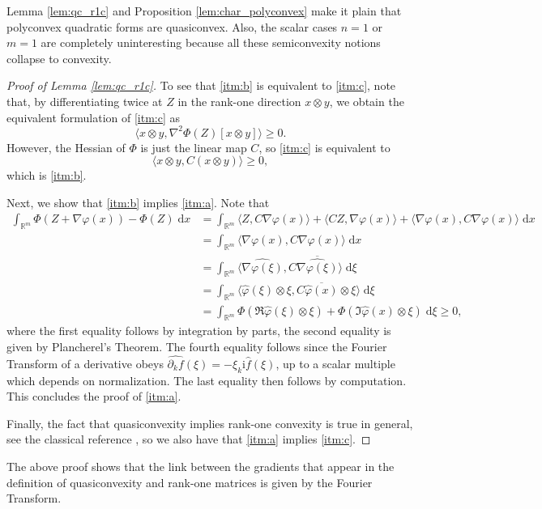 \documentclass[a4paper]{article}
\numberwithin{equation}{section}
\newcommand{\R}{\mathbb{R}}
\newcommand{\dif}{\mathrm{\;d}}
\theoremstyle{definition}
\theoremstyle{remark}
\begin{document}
Lemma \ref{lem:qc_r1c} and Proposition \ref{lem:char_polyconvex} make it plain that polyconvex quadratic forms are quasiconvex. Also, the scalar cases $n=1$ or $m=1$ are completely uninteresting because all these semiconvexity notions collapse to convexity.
\begin{proof}[Proof of Lemma \ref{lem:qc_r1c}]
To see that \ref{itm:b} is equivalent to \ref{itm:c}, note that, by differentiating twice at $Z$ in the rank-one direction $x\otimes y$, we obtain the equivalent formulation of \ref{itm:c} as
$$
\langle x\otimes y, \nabla^2 \Phi(Z) [x\otimes y] \rangle\geq 0.
$$
However, the Hessian of $\Phi$ is just the linear map $C$, so \ref{itm:c} is equivalent to
$$
\langle x\otimes y, C (x\otimes y) \rangle\geq 0,
$$
which is \ref{itm:b}. 

Next, we show that \ref{itm:b} implies \ref{itm:a}. Note that 
\begin{align*}
    \int_{\R^m} \Phi(Z+\nabla \varphi(x))-\Phi(Z)\mathrm{\;d} x&=  \int_{\R^m} \langle Z,C\nabla \varphi(x)\rangle +\langle CZ,\nabla \varphi(x)\rangle + \langle \nabla \varphi(x),C\nabla \varphi(x)\rangle \dif x\\
    &=\int_{\R^m}  \langle \nabla \varphi(x),C\nabla \varphi(x)\rangle \dif x\\
     &=\int_{\R^m}  \langle \widehat{\nabla \varphi(\xi)},C\overline{\widehat{\nabla \varphi(\xi)}}\rangle \dif \xi\\
      &=\int_{\R^m}  \langle  \hat \varphi(\xi)\otimes \xi,C \overline{\hat{\varphi}(x)}\otimes \xi \rangle \dif \xi\\
      &=\int_{\R^m}  \Phi(  \Re\hat \varphi(\xi)\otimes\xi)+ \Phi(\Im{\hat{\varphi}(x)}\otimes \xi) \dif \xi\geq0,
\end{align*}
where the first equality follows by integration by parts, the second equality is given by Plancherel's Theorem. The fourth equality follows since the Fourier Transform of a derivative obeys $\widehat{\partial_k f}(\xi)=-\xi_k\mathrm i \hat f(\xi)$, up to a scalar multiple which depends on normalization. The last equality then follows by computation. This concludes the proof of \ref{itm:a}.

Finally, the fact that quasiconvexity implies rank-one convexity is true in general, see the classical reference \cite[Thm. 5.3(i)]{Dacorogna}, so we also have that \ref{itm:a} implies \ref{itm:c}.
\end{proof}
The above proof shows that the link between the gradients that appear in the definition of quasiconvexity and rank-one matrices is given by the Fourier Transform.
\end{document}
